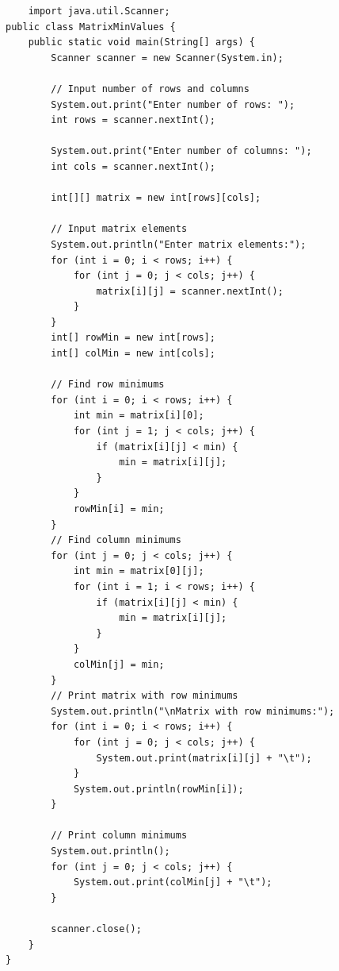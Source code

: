 \begin{verbatim}
    import java.util.Scanner;
public class MatrixMinValues {
    public static void main(String[] args) {
        Scanner scanner = new Scanner(System.in);

        // Input number of rows and columns
        System.out.print("Enter number of rows: ");
        int rows = scanner.nextInt();

        System.out.print("Enter number of columns: ");
        int cols = scanner.nextInt();

        int[][] matrix = new int[rows][cols];

        // Input matrix elements
        System.out.println("Enter matrix elements:");
        for (int i = 0; i < rows; i++) {
            for (int j = 0; j < cols; j++) {
                matrix[i][j] = scanner.nextInt();
            }
        }
        int[] rowMin = new int[rows];
        int[] colMin = new int[cols];

        // Find row minimums
        for (int i = 0; i < rows; i++) {
            int min = matrix[i][0];
            for (int j = 1; j < cols; j++) {
                if (matrix[i][j] < min) {
                    min = matrix[i][j];
                }
            }
            rowMin[i] = min;
        }
        // Find column minimums
        for (int j = 0; j < cols; j++) {
            int min = matrix[0][j];
            for (int i = 1; i < rows; i++) {
                if (matrix[i][j] < min) {
                    min = matrix[i][j];
                }
            }
            colMin[j] = min;
        }
        // Print matrix with row minimums
        System.out.println("\nMatrix with row minimums:");
        for (int i = 0; i < rows; i++) {
            for (int j = 0; j < cols; j++) {
                System.out.print(matrix[i][j] + "\t");
            }
            System.out.println(rowMin[i]);
        }

        // Print column minimums
        System.out.println();
        for (int j = 0; j < cols; j++) {
            System.out.print(colMin[j] + "\t");
        }

        scanner.close();
    }
}
\end{verbatim}